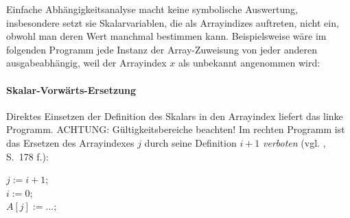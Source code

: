 Einfache Abhängigkeitsanalyse macht keine symbolische Auswertung,
insbesondere setzt sie Skalarvariablen, die als Arrayindizes auftreten,
nicht ein, obwohl man deren Wert manchmal bestimmen kann. Beispielsweise
wäre im folgenden Programm jede Instanz der Array-Zuweisung von jeder
anderen ausgabeabhängig, weil der Arrayindex $x$ als unbekannt
angenommen wird:


\begin{procedure}
\SetAlgoLined
{}
\end{procedure}

\paragraph{Skalar-Vorwärts-Ersetzung}
\label{sec:sve}

Direktes Einsetzen der Definition des Skalars in den Arrayindex liefert
das linke Programm. ACHTUNG: Gültigkeitsbereiche beachten! Im rechten
Programm ist das Ersetzen des Arrayindexes $j$ durch seine Definition
$i+1$ \emph{verboten} (vgl. \cite{Zima90}, S.~178 f.):\\[1cm]
\begin{minipage}{.4\textwidth}
    \begin{algorithm}[H]
    \end{algorithm}
\end{minipage}
\begin{minipage}{.4\textwidth}
    \begin{algorithm}[H]
    $j := i+1$;\\
    $i := 0$;\\
    $A[j] := ...$;\\
    \end{algorithm}
\end{minipage}

